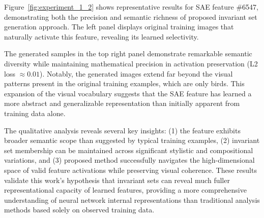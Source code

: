 \documentclass[licencjacka,en]{pracamgr}
\begin{document}
Figure~\ref{fig:experiment_1_2} shows representative results for SAE feature \#6547, demonstrating both the precision and semantic richness of proposed invariant set generation approach. The left panel displays original training images that naturally activate this feature, revealing its learned selectivity.

The generated samples in the top right panel demonstrate remarkable semantic diversity while maintaining mathematical precision in activation preservation (L2 loss $\approx 0.01$). Notably, the generated images extend far beyond the visual patterns present in the original training examples, which are only birds. This expansion of the visual vocabulary suggests that the SAE feature has learned a more abstract and generalizable representation than initially apparent from training data alone.

The qualitative analysis reveals several key insights: (1) the feature exhibits broader semantic scope than suggested by typical training examples, (2) invariant set membership can be maintained across significant stylistic and compositional variations, and (3) proposed method successfully navigates the high-dimensional space of valid feature activations while preserving visual coherence. These results validate this work's hypothesis that invariant sets can reveal much fuller representational capacity of learned features, providing a more comprehensive understanding of neural network internal representations than traditional analysis methods based solely on observed training data.
\end{document}
